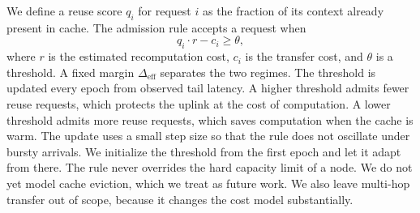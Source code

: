 We define a reuse score $q_i$ for request $i$ as the fraction of its context already present in cache.
The admission rule accepts a request when
\begin{equation}
\label{eq:admit}
q_i \cdot r - c_i \ge \theta,
\end{equation}
where $r$ is the estimated recomputation cost, $c_i$ is the transfer cost, and $\theta$ is a threshold.
\label{sec:method}
A fixed margin $\Delta_{\mathrm{eff}}$ separates the two regimes.
The threshold is updated every epoch from observed tail latency.
A higher threshold admits fewer reuse requests, which protects the uplink at the cost of computation.
A lower threshold admits more reuse requests, which saves computation when the cache is warm.
The update uses a small step size so that the rule does not oscillate under bursty arrivals.
We initialize the threshold from the first epoch and let it adapt from there.
The rule never overrides the hard capacity limit of a node.
We do not yet model cache eviction, which we treat as future work.
We also leave multi-hop transfer out of scope, because it changes the cost model substantially.
